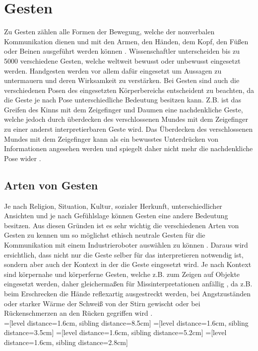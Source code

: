 \section{Gesten}
Zu Gesten zählen alle Formen der Bewegung, welche der nonverbalen Kommunikation dienen und mit den Armen, den Händen, dem Kopf, den Füßen oder Beinen ausgeführt werden können \cite{gestik_2020}. Wissenschaftler unterscheiden bis zu 5000 verschiedene Gesten, welche weltweit bewusst oder unbewusst eingesetzt werden. Handgesten werden vor allem dafür eingesetzt um Aussagen zu untermauern und deren Wirksamkeit zu verstärken. Bei Gesten sind auch die verschiedenen Posen des eingesetzten Körperbereichs entscheident zu beachten, da die Geste je nach Pose unterschiedliche Bedeutung besitzen kann. Z.B. ist das Greifen des Kinns mit dem Zeigefinger und Daumen eine nachdenkliche Geste, welche jedoch durch überdecken des verschlossenen Mundes mit dem Zeigefinger zu einer anderst interpretierbaren Geste wird. Das Überdecken des verschlossenen Mundes mit dem Zeigefinger kann als ein bewusstes Unterdrücken von Informationen angesehen werden und spiegelt daher nicht mehr die nachdenkliche Pose wider \cite[137\psq]{matschnig_korpersprache_2007}.

\subsection{Arten von Gesten}
Je nach Religion, Situation, Kultur, sozialer Herkunft, unterschiedlicher Ansichten und je nach Gefühlslage können Gesten eine andere Bedeutung besitzen. Aus diesen Gründen ist es sehr wichtig die verschiedenen Arten von Gesten zu kennen um so möglichst ethisch neutrale Gesten für die Kommunikation mit einem Industrieroboter auswählen zu können \cite{gesten_liste_2020}. Daraus wird ersichtlich, dass nicht nur die Geste selber für das interpretieren notwendig ist, sondern aber auch der Kontext in der die Geste eingesetzt wird. Je nach Kontext sind körpernahe und körperferne Gesten, welche z.B. zum Zeigen auf Objekte eingesetzt werden, daher gleichermaßen für Missinterpretationen anfällig \cite[137\psq]{matschnig_korpersprache_2007}, da z.B. beim Erschrecken die Hände reflexartig ausgestreckt werden, bei Angstzuständen oder starker Wärme der Schweiß von der Stirn gewischt oder bei Rückenschmerzen an den Rücken gegriffen wird \cite{matschnig_glossar_nodate}.\\

=[level distance=1.6cm, sibling distance=8.5cm]
=[level distance=1.6cm, sibling distance=3.5cm]
=[level distance=1.6cm, sibling distance=5.2cm]
=[level distance=1.6cm, sibling distance=2.8cm]

